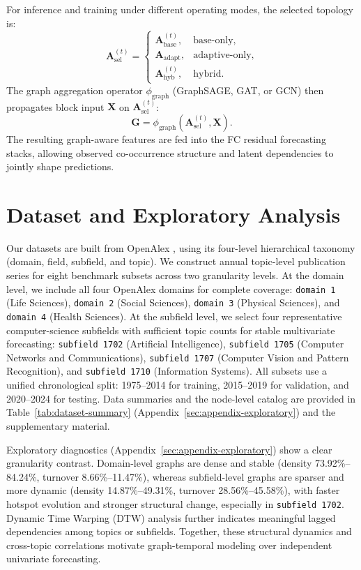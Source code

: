 \documentclass[runningheads]{llncs}
\begin{document}
For inference and training under different operating modes, the selected topology is:
\begin{equation}
\mathbf{A}^{(t)}_{\text{sel}} =
\begin{cases}
\mathbf{A}^{(t)}_{\text{base}}, & \text{base-only},\\
\mathbf{A}_{\text{adapt}}, & \text{adaptive-only},\\
\mathbf{A}^{(t)}_{\text{hyb}}, & \text{hybrid}.
\end{cases}
\end{equation}
The graph aggregation operator $\phi_{\text{graph}}$ (GraphSAGE, GAT, or GCN) then propagates block input $\mathbf{X}$ on $\mathbf{A}^{(t)}_{\text{sel}}$:
\begin{equation}
\mathbf{G}=\phi_{\text{graph}}(\mathbf{A}^{(t)}_{\text{sel}},\mathbf{X}).
\end{equation}
The resulting graph-aware features are fed into the FC residual forecasting stacks, allowing observed co-occurrence structure and latent dependencies to jointly shape predictions.

\section{Dataset and Exploratory Analysis}
Our datasets are built from OpenAlex \cite{priem2022openalex}, using its four-level hierarchical taxonomy (domain, field, subfield, and topic). We construct annual topic-level publication series for eight benchmark subsets across two granularity levels. At the domain level, we include all four OpenAlex domains for complete coverage: \texttt{domain 1} (Life Sciences), \texttt{domain 2} (Social Sciences), \texttt{domain 3} (Physical Sciences), and \texttt{domain 4} (Health Sciences). At the subfield level, we select four representative computer-science subfields with sufficient topic counts for stable multivariate forecasting: \texttt{subfield 1702} (Artificial Intelligence), \texttt{subfield 1705} (Computer Networks and Communications), \texttt{subfield 1707} (Computer Vision and Pattern Recognition), and \texttt{subfield 1710} (Information Systems). All subsets use a unified chronological split: 1975--2014 for training, 2015--2019 for validation, and 2020--2024 for testing. Data summaries and the node-level catalog are provided in Table~\ref{tab:dataset-summary} (Appendix~\ref{sec:appendix-exploratory}) and the supplementary material.

Exploratory diagnostics (Appendix~\ref{sec:appendix-exploratory}) show a clear granularity contrast. Domain-level graphs are dense and stable (density 73.92\%--84.24\%, turnover 8.66\%--11.47\%), whereas subfield-level graphs are sparser and more dynamic (density 14.87\%--49.31\%, turnover 28.56\%--45.58\%), with faster hotspot evolution and stronger structural change, especially in \texttt{subfield 1702}. Dynamic Time Warping (DTW) analysis further indicates meaningful lagged dependencies among topics or subfields. Together, these structural dynamics and cross-topic correlations motivate graph-temporal modeling over independent univariate forecasting.
\end{document}
